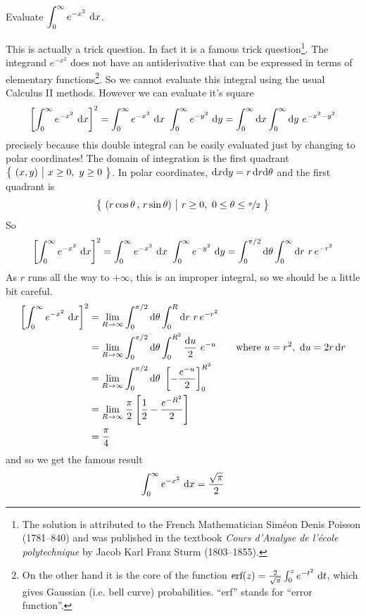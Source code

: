 \begin{eg}\label{eg change to polar B}
Evaluate $\displaystyle\int_0^\infty e^{-x^2}\ \dee{x}$.

\soln
This is actually a trick question. In fact it is a famous trick 
question\footnote{The solution is attributed to the French Mathematician
Sim\'eon Denis Poisson (1781--840) and was published in the textbook
\emph{Cours d'Analyse de l'\'ecole polytechnique} by 
Jacob Karl Franz Sturm (1803--1855).}.
The integrand $e^{-x^2}$ does not have an antiderivative that can 
be expressed in terms of elementary functions\footnote{On the other hand it is the core of the function 
$\text{erf}(z)=\frac{2}{\sqrt{\pi}}\int_0^z e^{-t^2}\ \mathrm{d}t$, which 
gives Gaussian (i.e. bell curve) probabilities.
``erf'' stands for ``error function''.}.
So we cannot evaluate this integral using the usual Calculus II methods. 
However we can evaluate it's square
\begin{align*}
\left[\int_0^\infty e^{-x^2}\ \mathrm{d}x\right]^2
=\int_0^\infty e^{-x^2}\ \mathrm{d}x\   \int_0^\infty e^{-y^2}\ \mathrm{d}y
=\int_0^\infty \mathrm{d}x \int_0^\infty \mathrm{d}y\ e^{-x^2-y^2}
\end{align*}
precisely because this double integral can be easily 
evaluated just by changing to polar coordinates!
The domain of integration is the first quadrant
$\big\{ \ (x,y)\ \big|\ x\ge 0,\ y\ge 0\ \big\}$. In polar coordinates, 
$\mathrm{d}x\mathrm{d}y = r\,\mathrm{d}r\mathrm{d}\theta$ and the first  quadrant is 
\begin{equation*}
\Set{(r\cos\theta\,,\,r\sin\theta)}{r\ge 0,\ 0\le\theta\le \nicefrac{\pi}{2}}
\end{equation*}
So
\begin{align*}
\left[\int_0^\infty e^{-x^2}\ \mathrm{d}x\right]^2
=\int_0^\infty e^{-x^2}\ \mathrm{d}x\   \int_0^\infty e^{-y^2}\ \mathrm{d}y
=\int_0^{\pi/2}\mathrm{d}\theta\int_0^\infty \mathrm{d}r\ r\, e^{-r^2}
\end{align*}
As $r$ runs all the way to $+\infty$, this is an improper integral,
so we should be a little bit careful.
\begin{align*}
\left[\int_0^\infty e^{-x^2}\ \mathrm{d}x\right]^2
&=\lim_{R\rightarrow\infty}
            \int_0^{\pi/2}\mathrm{d}\theta\int_0^R \mathrm{d}r\ r\, e^{-r^2} \\
&=\lim_{R\rightarrow\infty}
    \int_0^{\pi/2}\mathrm{d}\theta\int_0^{R^2} \frac{\mathrm{d}u}{2}\ e^{-u} \qquad
   \text{where } u= r^2,\ \mathrm{d}u =2r\,\mathrm{d}r \\
&=\lim_{R\rightarrow\infty}
    \int_0^{\pi/2}\mathrm{d}\theta\ \left[-\frac{e^{-u}}{2}\right]_0^{R^2} \\
&=\lim_{R\rightarrow\infty} \frac{\pi}{2}                  
                 \left[\frac{1}{2}-\frac{e^{-R^2}}{2}\right] \\
&=\frac{\pi}{4}
\end{align*}
and so we get the famous result
\begin{align*}
\int_0^\infty e^{-x^2}\ \mathrm{d}x =\frac{\sqrt{\pi}}{2}
\end{align*}


\end{eg}
